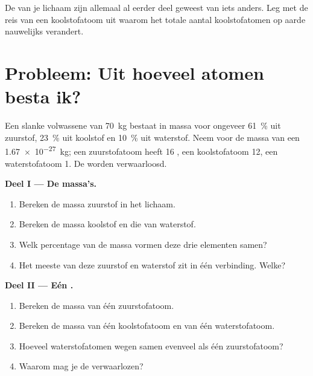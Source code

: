 \begin{exercise}[$\star\star\star$]\label{exo:g9:elements-universe-earth:12}
De  van je lichaam zijn allemaal al eerder deel geweest van iets
anders. Leg met de reis van een koolstofatoom uit waarom het totale
aantal koolstofatomen op aarde nauwelijks verandert.
\end{exercise}

\section{Probleem: Uit hoeveel atomen besta ik?}

\begin{problem}
\label{pb:g9:elements-universe-earth:1}
Een slanke volwassene van \qty{70}{kg} bestaat in massa voor ongeveer
\qty{61}{\percent} uit zuurstof, \qty{23}{\percent} uit koolstof en
\qty{10}{\percent} uit waterstof. Neem voor de massa van een 
\qty{1.67e-27}{kg}; een zuurstofatoom heeft 16 , een
koolstofatoom 12, een waterstofatoom 1. De  worden
verwaarloosd.

\medskip
\noindent\textbf{Deel I --- De massa's.}
\begin{enumerate}
  \item Bereken de massa zuurstof in het lichaam.
  \item Bereken de massa koolstof en die van waterstof.
  \item Welk percentage van de massa vormen deze drie elementen samen?
  \item Het meeste van deze zuurstof en waterstof zit in één verbinding.
        Welke?
\end{enumerate}

\medskip
\noindent\textbf{Deel II --- Eén .}
\begin{enumerate}[resume]
  \item Bereken de massa van één zuurstofatoom.
  \item Bereken de massa van één koolstofatoom en van één
        waterstofatoom.
  \item Hoeveel waterstofatomen wegen samen evenveel als één
        zuurstofatoom?
  \item Waarom mag je de  verwaarlozen?
\end{enumerate}


\end{problem}
